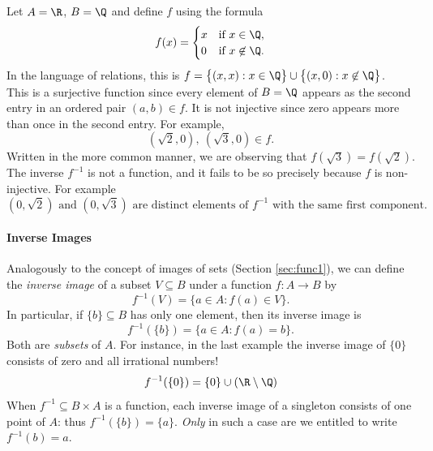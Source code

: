 \begin{example}
Let $A=\R$, $B=\Q$ and define $f$ using the formula 
\[f(x)=\begin{cases}
x&\text{if }x\in\Q,\\
0&\text{if }x\not\in\Q.
\end{cases}\]
In the language of relations, this is $f=\bigl\{(x,x):x\in\Q\bigr\}\cup\bigl\{(x,0):x\not\in\Q\bigr\}$.\\[2pt]
This is a surjective function since every element of $B=\Q$ appears as the second entry in an ordered pair $(a,b)\in f$. It is not injective since zero appears more than once in the second entry. For example,
\[(\sqrt 2,0),\ (\sqrt 3,0)\in f.\]
Written in the more common manner, we are observing that $f(\sqrt 3)=f(\sqrt 2)$.\\[2pt]
The inverse $f^{-1}$ is not a function, and it fails to be so precisely because $f$ is non-injective. For example
\[(0,\sqrt 2)\text{ and } (0,\sqrt 3)\text{ are distinct elements of $f^{-1}$ with the same  first component.}\]
\end{example}

\paragraph{Inverse Images}

Analogously to the concept of images of sets (Section \ref{sec:func1}), we can define the \emph{inverse image} of a subset $V\subseteq B$ under a function $f:A\to B$ by
\[f^{-1}(V)=\{a\in A:f(a)\in V\}.\]
In particular, if $\{b\}\subseteq B$ has only one element, then its inverse image is
\[f^{-1}(\{b\})=\{a\in A:f(a)=b\}.\]
Both are \emph{subsets} of $A$. For instance, in the last example the inverse image of $\{0\}$ consists of zero and all irrational numbers!
\[f^{-1}(\{0\})=\{0\}\cup(\R\setminus\Q)\]
When $f^{-1}\subseteq B\times A$ is a function, each inverse image of a singleton consists of one point of $A$: thus $f^{-1}(\{b\})=\{a\}$. \emph{Only} in such a case are we entitled to write $f^{-1}(b)=a$.\pagebreak[2]




